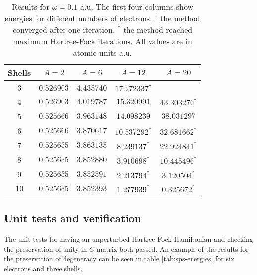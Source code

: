 \documentclass[11pt]{article}
\begin{document}
\begin{table}[H]
	\centering
	\caption{Results for $\omega = 0.1$ a.u. The first four columns show energies for different numbers of electrons. $^\dagger$ the method converged after one iteration. $^*$ the method reached maximum Hartree-Fock iterations. All values are in atomic units a.u.}
	\begin{tabular}{c c c c c}
		\\ \hline \hline
		Shells 	& $A = 2$	& $A = 6$ 	& $A = 12$ 	& $A = 20$ 	\\ \hline
         3 &    0.526903 &     4.435740  &  $17.272337^\dagger$ &            \\ 
         4 & $  0.526903$ & $  4.019787$ & $ 15.320991$ 	& $ 43.303270^\dagger$  \\ 
         5 & $  0.525666$ & $  3.963148$ & $ 14.098239$ 	& $ 38.031297$  \\ 
         6 & $  0.525666$ & $  3.870617$ & $ 10.537292^*$ 	& $ 32.681662^*$  \\ 
         7 & $  0.525635$ & $  3.863135$ & $  8.239137^*$ 	& $ 22.924841^*$  \\ 
         8 & $  0.525635$ & $  3.852880$ & $  3.910698^*$ 	& $ 10.445496^*$  \\ 
         9 & $  0.525635$ & $  3.852591$ & $  2.213794^*$ 	& $  3.120504^*$  \\ 
        10 &    0.525635  &    3.852393  &   $1.277939^*$ 	&   $0.325672^*$  \\ 
        \hline \hline
	\end{tabular}
	\label{tab:omega01}
\end{table}

\subsection{Unit tests and verification}
The unit tests for having an unperturbed Hartree-Fock Hamiltonian and checking the preservation of unity in $C$-matrix both passed. An example of the results for the preservation of degeneracy can be seen in table \ref{tab:sps-energies} for six electrons and three shells.
\end{document}
